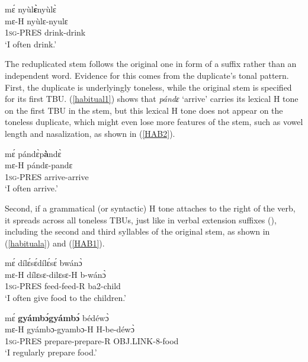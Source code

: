 \begin{exe} 
\ex\label{habitual}
  \glll  mɛ́ nyùl{\bfseries ɛ̀}nyùlɛ̀ \\
            mɛ-H nyùlɛ-nyulɛ \\
             1\textsc{sg}-PRES drink-drink  \\
    \trans `I often drink.'
\end{exe}

The reduplicated stem follows the original one in form of a suffix rather than an independent word. Evidence for this comes from the duplicate's tonal pattern.  First, the duplicate is underlyingly toneless, while the original stem is specified for its first TBU. (\ref{habitual1}) shows that {\itshape pándɛ} `arrive' carries its lexical H tone on the first TBU in the stem, but this lexical H tone does not appear on the toneless duplicate, which might even lose more features of the stem, such as vowel length and nasalization, as shown in (\ref{HAB2}).

\begin{exe} 
\ex\label{habitual1}
  \glll  mɛ́ pándɛ̀p{\bfseries à}ndɛ̀ \\
            mɛ-H pándɛ-pandɛ  \\
             1\textsc{sg}-PRES arrive-arrive  \\
    \trans `I often arrive.'
\end{exe}

Second, if a grammatical (or syntactic) H tone attaches to the right of the verb, it spreads across all toneless TBUs, just like in verbal extension suffixes (), including the second and third syllables of the original stem, as shown in (\ref{habituala}) and (\ref{HAB1}). 

\begin{exe}
\ex \label{habituala}
  \glll  mɛ́ dílɛ́sɛ́dílɛ́sɛ́ bwánɔ̀ \\
            mɛ-H dílɛsɛ-dilɛsɛ-H b-wánɔ̀ \\
             1\textsc{sg}-PRES feed-feed-R ba2-child  \\
    \trans `I often give food to the children.'
\end{exe}

\begin{exe} 
\ex\label{HAB1}
  \glll     mɛ́ {\bfseries gyámbɔ́gyámbɔ́} bédéwɔ̀ \\
            mɛ-H gyámbɔ-gyambɔ-H H-be-déwɔ̀ \\
              1\textsc{sg}-PRES prepare-prepare-R OBJ.LINK-8-food  \\
    \trans `I regularly prepare food.'
\end{exe}


